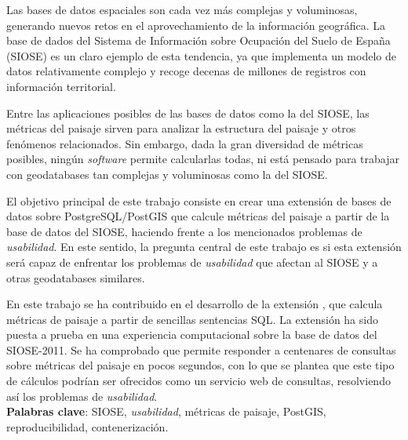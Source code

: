 
\begin{resumen}

Las bases de datos espaciales son cada vez más complejas y voluminosas, generando nuevos retos en el aprovechamiento de la información geográfica. La base de dados del Sistema de Información sobre Ocupación del Suelo de España (SIOSE) es un claro ejemplo de esta tendencia, ya que implementa un modelo de datos relativamente complejo y recoge decenas de millones de registros con información territorial.

Entre las aplicaciones posibles de las bases de datos como la del SIOSE, las métricas del paisaje sirven para analizar la estructura del paisaje y otros fenómenos relacionados. Sin embargo, dada la gran diversidad de métricas posibles, ningún \textit{software} permite calcularlas todas, ni está pensado para trabajar con geodatabases tan complejas y voluminosas como la del SIOSE.
 
El objetivo principal de este trabajo consiste en crear una extensión de bases de datos sobre PostgreSQL/PostGIS que calcule métricas del paisaje a partir de la base de datos del SIOSE, haciendo frente a los mencionados problemas de \textit{usabilidad}. En este sentido, la pregunta central de este trabajo es si esta extensión será capaz de enfrentar los problemas de \textit{usabilidad} que afectan al SIOSE y a otras geodatabases similares.

En este trabajo se ha contribuido en el desarrollo de la extensión \pgland{}, que calcula métricas de paisaje a partir de sencillas sentencias SQL. La extensión ha sido puesta a prueba en una experiencia computacional sobre la base de datos del SIOSE-2011. Se ha comprobado que \pgland{} permite responder a centenares de consultas sobre métricas del paisaje en pocos segundos, con lo que se plantea que este tipo de cálculos podrían ser ofrecidos como un servicio web de consultas, resolviendo así los problemas de \textit{usabilidad}.\\


\textbf{Palabras clave}: SIOSE, \textit{usabilidad}, métricas de paisaje, PostGIS, reproducibilidad, contenerización.


\end{resumen}
